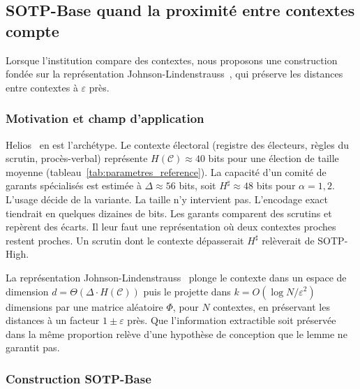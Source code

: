 \subsection{SOTP-Base quand la proximit\'e entre contextes compte}
\label{subsec:sotp_base}
\begin{sloppypar}
Lorsque l'institution compare des contextes, nous proposons une construction fond\'ee sur la
repr\'esentation Johnson-Lindenstrauss~\cite{JohnsonLindenstrauss84}, qui pr\'eserve les distances
entre contextes \`a $\varepsilon$ pr\`es.

\subsubsection{Motivation et champ d'application}
\label{subsubsec:motivation_base}

Helios~\cite{Adida08,Adida09UCL} en est l'arch\'etype. Le contexte \'electoral (registre des
\'electeurs, r\`egles du scrutin, proc\`es-verbal) repr\'esente $H(\mathcal{C}) \approx 40$ bits pour
une \'election de taille moyenne (tableau~\ref{tab:parametres_reference}). La capacit\'e d'un comit\'e
de garants sp\'ecialis\'es est estim\'ee
\`a $\Delta \approx 56$ bits, soit $H^\sharp \approx 48$ bits pour $\alpha = 1{,}2$. L'usage d\'ecide
de la variante. La taille n'y intervient pas. L'encodage exact tiendrait en quelques dizaines de
bits. Les garants comparent des scrutins et rep\`erent des \'ecarts. Il leur faut
une repr\'esentation o\`u deux contextes proches restent proches. Un scrutin dont le contexte
d\'epasserait $H^\sharp$ rel\`everait de SOTP-High.

La repr\'esentation Johnson-Lindenstrauss~\cite{JohnsonLindenstrauss84,DasguptaGupta03,Achlioptas2003} plonge
le contexte dans un espace de dimension $d = \Theta(\Delta \cdot H(\mathcal{C}))$ puis le projette
dans $k = O(\log N/\varepsilon^2)$ dimensions par une matrice al\'eatoire $\Phi$, pour $N$ contextes,
en pr\'eservant les distances \`a un facteur $1 \pm \varepsilon$ pr\`es. Que l'information extractible soit
pr\'eserv\'ee dans la m\^eme proportion rel\`eve d'une hypoth\`ese de conception que le
lemme ne garantit pas.

\subsubsection{Construction SOTP-Base}
\label{subsubsec:construction_base}


\end{sloppypar}
